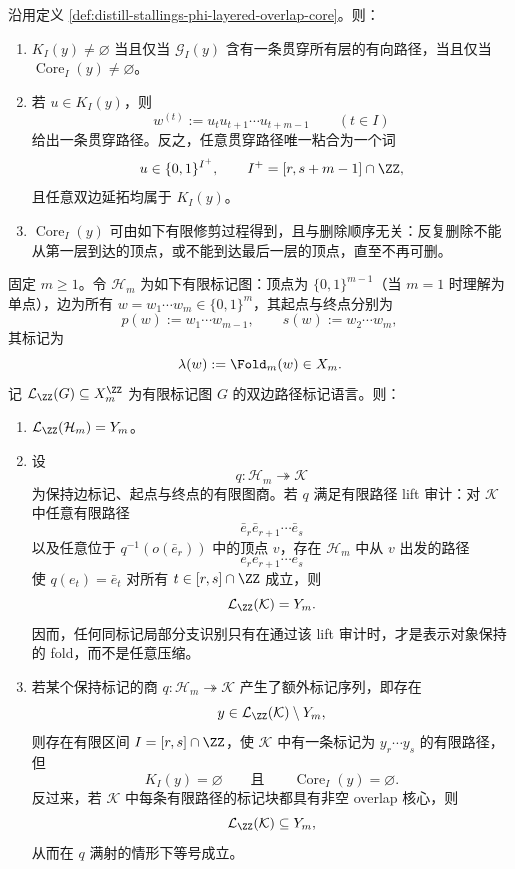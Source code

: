 \begin{proposition}\label{prop:distill-stallings-phi-layered-overlap-core-trimming}
沿用定义 \ref{def:distill-stallings-phi-layered-overlap-core}。则：
\begin{enumerate}
  \item \(K_I(y)\ne\varnothing\) 当且仅当 \(\mathcal G_I(y)\) 含有一条贯穿所有层的有向路径，当且仅当 \(\operatorname{Core}_I(y)\ne\varnothing\)。
  \item 若 \(u\in K_I(y)\)，则
  \[
  w^{(t)}:=u_tu_{t+1}\cdots u_{t+m-1}\qquad(t\in I)
  \]
  给出一条贯穿路径。反之，任意贯穿路径唯一粘合为一个词
  \[
  u\in\{0,1\}^{I^+},\qquad I^+=[r,s+m-1]\cap\ZZ,
  \]
  且任意双边延拓均属于 \(K_I(y)\)。
  \item \(\operatorname{Core}_I(y)\) 可由如下有限修剪过程得到，且与删除顺序无关：反复删除不能从第一层到达的顶点，或不能到达最后一层的顶点，直至不再可删。
\end{enumerate}
\end{proposition}
\begin{proposition}
\label{distill:stallings_foldings_and_bestvina_handel_train_tracks-local_fold_preserves_represented_object-phi-presentation-quotient-core-audit}
固定 \(m\ge1\)。令 \(\mathcal H_m\) 为如下有限标记图：顶点为
\(\{0,1\}^{m-1}\)（当 \(m=1\) 时理解为单点），边为所有
\(w=w_1\cdots w_m\in\{0,1\}^m\)，其起点与终点分别为
\[
p(w):=w_1\cdots w_{m-1},
\qquad
s(w):=w_2\cdots w_m,
\]
其标记为
\[
\lambda(w):=\Fold_m(w)\in X_m.
\]
记 \(\mathcal L_{\ZZ}(G)\subseteq X_m^{\ZZ}\) 为有限标记图 \(G\) 的双边路径标记语言。则：
\begin{enumerate}
  \item \(\mathcal L_{\ZZ}(\mathcal H_m)=Y_m\)。
  \item 设
  \[
  q:\mathcal H_m\twoheadrightarrow \mathcal K
  \]
  为保持边标记、起点与终点的有限图商。若 \(q\) 满足有限路径 lift 审计：对 \(\mathcal K\) 中任意有限路径
  \[
  \bar e_r\bar e_{r+1}\cdots\bar e_s
  \]
  以及任意位于 \(q^{-1}(o(\bar e_r))\) 中的顶点 \(v\)，存在 \(\mathcal H_m\) 中从 \(v\) 出发的路径
  \[
  e_r e_{r+1}\cdots e_s
  \]
  使 \(q(e_t)=\bar e_t\) 对所有 \(t\in[r,s]\cap\ZZ\) 成立，则
  \[
  \mathcal L_{\ZZ}(\mathcal K)=Y_m.
  \]
  因而，任何同标记局部分支识别只有在通过该 lift 审计时，才是表示对象保持的 fold，而不是任意压缩。
  \item 若某个保持标记的商 \(q:\mathcal H_m\twoheadrightarrow\mathcal K\) 产生了额外标记序列，即存在
  \[
  y\in \mathcal L_{\ZZ}(\mathcal K)\setminus Y_m,
  \]
  则存在有限区间 \(I=[r,s]\cap\ZZ\)，使 \(\mathcal K\) 中有一条标记为 \(y_r\cdots y_s\) 的有限路径，但
  \[
  K_I(y)=\varnothing
  \qquad\text{且}
  \qquad
  \operatorname{Core}_I(y)=\varnothing .
  \]
  反过来，若 \(\mathcal K\) 中每条有限路径的标记块都具有非空 overlap 核心，则
  \[
  \mathcal L_{\ZZ}(\mathcal K)\subseteq Y_m,
  \]
  从而在 \(q\) 满射的情形下等号成立。
\end{enumerate}
\end{proposition}
